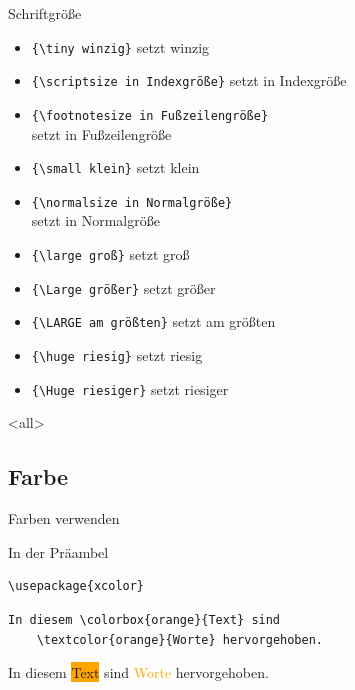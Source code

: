 \begin{Frame}[fragile]{Schriftgröße}
  \begin{itemize}
    \item \lstinline-{\tiny winzig}- setzt {\tiny winzig}
    \item \lstinline-{\scriptsize in Indexgröße}- setzt {\scriptsize in Indexgröße}
    \item \lstinline-{\footnotesize in Fußzeilengröße}-\\ setzt {\footnotesize in Fußzeilengröße}
    \item \lstinline-{\small klein}- setzt {\small klein}
    \item \lstinline-{\normalsize in Normalgröße}-\\ setzt {\normalsize in Normalgröße}
    \item \lstinline-{\large groß}- setzt {\large groß}
    \item \lstinline-{\Large größer}- setzt {\Large größer}
    \item \lstinline-{\LARGE am größten}- setzt {\LARGE am größten}
    \item \lstinline-{\huge riesig}- setzt {\huge riesig}
    \item \lstinline-{\Huge riesiger}- setzt {\Huge riesiger}
  \end{itemize}
\end{Frame}

\mode
<all>

\jonny


\subsection{Farbe}

\begin{Frame}[fragile]{Farben verwenden}
  \begin{Block}{In der Präambel}
    \begin{lstlisting}[gobble=6,style=block]
      \usepackage{xcolor}
    \end{lstlisting}
  \end{Block}

  \xxx

  \begin{lstlisting}[gobble=4]
    In diesem \colorbox{orange}{Text} sind
    \textcolor{orange}{Worte} hervorgehoben.
  \end{lstlisting}

  In diesem \colorbox{orange}{Text} sind
  \textcolor{orange}{Worte} hervorgehoben.
\end{Frame}

